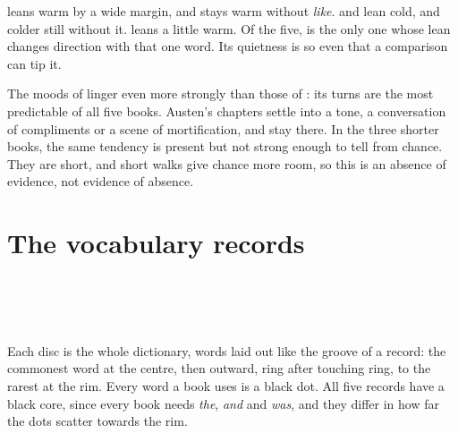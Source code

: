 \noindent {} leans warm by a wide margin, and stays warm
without \emph{like}.  and  lean cold, and
colder still without it.  leans a little warm. Of the five,
 is the only one whose lean changes direction with that one word.
Its quietness is so even that a comparison can tip it.

The moods of  linger even more strongly than those of
: its turns are the most predictable of all five books. Austen's
chapters settle into a tone, a conversation of compliments or a scene of
mortification, and stay there. In the three shorter books, the same tendency is
present but not strong enough to tell from chance. They are short, and short
walks give chance more room, so this is an absence of evidence, not evidence
of absence.

\clearpage
\section{The vocabulary records}

\begin{center}
\hfill
{}\hfill
{}\\[-1mm]
\hfill{}\hfill{}\\[2mm]
\hspace{6mm}
\\[-1mm]
\hspace{6mm}
\end{center}

\noindent Each disc is the whole dictionary,  words laid out
like the groove of a record: the commonest word at the centre, then outward,
ring after touching ring, to the rarest at the rim. Every word a book uses is a
black dot. All five records have a black core, since every book needs
\emph{the}, \emph{and} and \emph{was}, and they differ in how far the dots
scatter towards the rim.


